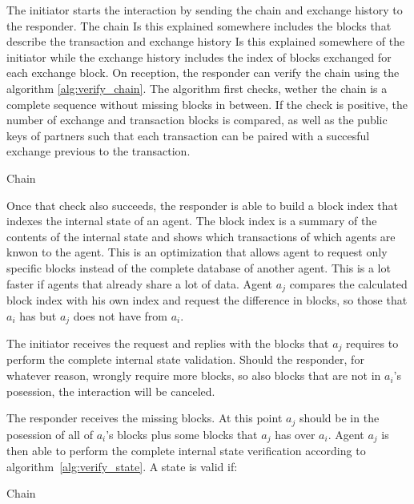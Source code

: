 The initiator starts the interaction by sending the chain and exchange history to the responder. The
chain{\color{red} Is this explained somewhere} includes the blocks that describe the transaction and 
exchange history {\color{red} Is this explained somewhere} of the initiator while the exchange 
history includes the index of blocks exchanged for each exchange block. On reception, the responder 
can verify the chain using the algorithm \ref{alg:verify_chain}. The algorithm first checks,
wether the chain is a complete sequence without missing blocks in between. If the check is positive,
the number of exchange and transaction blocks is compared, as well as the public keys of partners
such that each transaction can be paired with a succesful exchange previous to the transaction.

\begin{algorithm}
\caption{Chain }\label{alg:verify_chain}
\begin{algorithmic}[1]
\EndProcedure
\end{algorithmic}
\end{algorithm}

Once that check also succeeds, the responder is able to build a block index that indexes the internal
state of an agent. The block index is a summary of the contents of the internal state and shows
which transactions of which agents are knwon to the agent. This is an optimization that allows agent
to request only specific blocks instead of the complete database of another agent. This is a lot 
faster if agents that already share a lot of data. Agent $a_j$ compares the calculated block index
with his own index and request the difference in blocks, so those that $a_i$ has but $a_j$ does not 
have from $a_i$.

The initiator receives the request and replies with the blocks that $a_j$ requires to perform the 
complete internal state validation. Should the responder, for whatever reason, wrongly require more
blocks, so also blocks that are not in $a_i$'s posession, the interaction will be canceled. 

The responder receives the missing blocks. At this point $a_j$ should be in the posession of all
of $a_i$'s blocks plus some blocks that $a_j$ has over $a_i$. Agent $a_j$ is then able to perform
the complete internal state verification according to algorithm~\ref{alg:verify_state}. A state is
valid if:

\begin{algorithm}
    \caption{Chain }\label{alg:verify_state}
    \begin{algorithmic}[1]
    \EndProcedure
    \end{algorithmic}
\end{algorithm}

